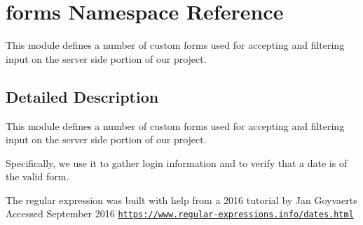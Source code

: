 \hypertarget{namespaceforms}{}\section{forms Namespace Reference}
\label{namespaceforms}


This module defines a number of custom forms used for accepting and filtering input on the server side portion of our project.  




\subsection{Detailed Description}
This module defines a number of custom forms used for accepting and filtering input on the server side portion of our project. 

Specifically, we use it to gather login information and to verify that a date is of the valid form.

The regular expression was built with help from a 2016 tutorial by Jan Goyvaerts Accessed September 2016 \href{https://www.regular-expressions.info/dates.html}{\tt https\+://www.\+regular-\/expressions.\+info/dates.\+html} 